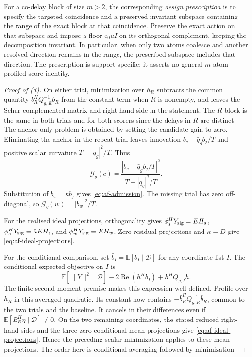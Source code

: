 For a co-delay block of size $m>2$, the corresponding
\emph{design prescription} is to specify the targeted coincidence
and a preserved invariant subspace containing the range of the
exact block at that coincidence. Preserve the exact action on
that subspace and impose a floor $c_0uI$ on its orthogonal
complement, keeping the decomposition invariant. In particular,
when only two atoms coalesce and another resolved direction remains
in the range, the prescribed subspace includes that direction.
The prescription is support-specific; it asserts no general
$m$-atom profiled-score identity.

\begin{proof}[Proof of \textup{(d)}]
On either trial, minimization over $h_R$ subtracts the common
quantity $b_R^HQ_{g,R}^{-1}b_R$ from the constant term when $R$ is
nonempty, and leaves the Schur-complemented matrix and right-hand
side in the statement. The $R$ block is the same in both trials
and for both scorers since the delays in $R$ are distinct. The
anchor-only problem is obtained by setting the candidate gain to
zero. Eliminating the anchor in the repeat trial leaves innovation
$b_c-\bar q_g b_j/T$ and positive scalar curvature $T-|q_g|^2/T$.
Thus
\[
 \mathcal G_g(c)
 =\frac{|b_c-\bar q_g b_j/T|^2}{T-|q_g|^2/T}.
\]
Substitution of $b_c=\bar\kappa b_j$ gives
\eqref{eq:af-admission}. The missing trial has zero off-diagonal,
so $\mathcal G_g(w)=|b_w|^2/T$.

For the realised ideal projections, orthogonality gives
$\phi_j^HY_{\rm sig}=EH_s$,
$\phi_c^HY_{\rm sig}=\bar\kappa EH_s$, and
$\phi_w^HY_{\rm sig}=EH_w$. Zero residual projections and
$\kappa=D$ give \eqref{eq:af-ideal-projections}.

For the conditional comparison, set
$\bar b_I=\mathbb E[b_I\mid\mathscr D]$ for any coordinate list $I$.
The conditional expected objective on $I$ is
\[
 \mathbb E[\|Y\|^2\mid\mathscr D]
       -2\operatorname{Re}(h^H\bar b_I)+h^HQ_{g,I}h .
\]
The finite second-moment premise makes this expression well defined.
Profile over $h_R$ in this averaged quadratic. Its constant now
contains $-\bar b_R^HQ_{g,R}^{-1}\bar b_R$, common to the two trials
and the baseline. It cancels in their differences even if
$\mathbb E[B_R^H\eta\mid\mathscr D]\ne0$. On the two remaining
coordinates, the stated reduced right-hand sides and the three
zero conditional-mean projections give
\eqref{eq:af-ideal-projections}. Hence the preceding scalar
minimization applies to these mean projections. The order here is
conditional averaging followed by minimization.


\end{proof}
